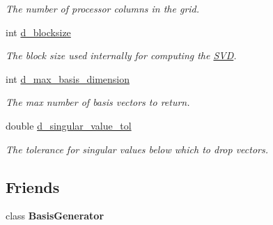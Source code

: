 \begin{DoxyCompactItemize}
\begin{DoxyCompactList}\small\item\em The number of processor columns in the grid. \end{DoxyCompactList}\item 
\hypertarget{class_c_a_r_o_m_1_1_static_s_v_d_ab9136905dc7a77975aa22baf5b26cebf}{int \hyperlink{class_c_a_r_o_m_1_1_static_s_v_d_ab9136905dc7a77975aa22baf5b26cebf}{d\-\_\-blocksize}}\label{class_c_a_r_o_m_1_1_static_s_v_d_ab9136905dc7a77975aa22baf5b26cebf}

\begin{DoxyCompactList}\small\item\em The block size used internally for computing the \hyperlink{class_c_a_r_o_m_1_1_s_v_d}{S\-V\-D}. \end{DoxyCompactList}\item 
\hypertarget{class_c_a_r_o_m_1_1_static_s_v_d_a8ccff71fcfbf639a2f38a1e438f520dd}{int \hyperlink{class_c_a_r_o_m_1_1_static_s_v_d_a8ccff71fcfbf639a2f38a1e438f520dd}{d\-\_\-max\-\_\-basis\-\_\-dimension}}\label{class_c_a_r_o_m_1_1_static_s_v_d_a8ccff71fcfbf639a2f38a1e438f520dd}

\begin{DoxyCompactList}\small\item\em The max number of basis vectors to return. \end{DoxyCompactList}\item 
\hypertarget{class_c_a_r_o_m_1_1_static_s_v_d_a02d8eb7feaad508faa2abba9e1de6a4f}{double \hyperlink{class_c_a_r_o_m_1_1_static_s_v_d_a02d8eb7feaad508faa2abba9e1de6a4f}{d\-\_\-singular\-\_\-value\-\_\-tol}}\label{class_c_a_r_o_m_1_1_static_s_v_d_a02d8eb7feaad508faa2abba9e1de6a4f}

\begin{DoxyCompactList}\small\item\em The tolerance for singular values below which to drop vectors. \end{DoxyCompactList}\end{DoxyCompactItemize}
\subsection*{Friends}
\begin{DoxyCompactItemize}
\item 
\hypertarget{class_c_a_r_o_m_1_1_static_s_v_d_a14677f178902af98cccb02b0058fd326}{class {\bfseries Basis\-Generator}}\label{class_c_a_r_o_m_1_1_static_s_v_d_a14677f178902af98cccb02b0058fd326}

\end{DoxyCompactItemize}


